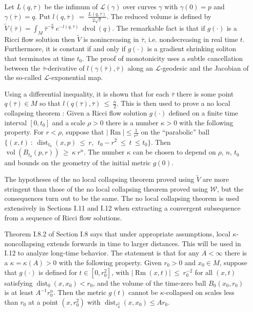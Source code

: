\documentclass[12pt]{amsart}
\newcommand{\dist}{\operatorname{dist}}
\newcommand{\dvol}{\operatorname{dvol}}
\newcommand{\Rm}{\operatorname{Rm}}
\newcommand{\vol}{\operatorname{vol}}
\numberwithin{equation}{section}
\theoremstyle{plain}
\theoremstyle{definition}
\theoremstyle{remark}
\begin{document}
Let $L(q, \overline{\tau})$
be the infimum of ${\mathcal L}(\gamma)$ over curves $\gamma$ with
$\gamma(0) = p$ and
$\gamma(\overline{\tau}) = q$. Put $l(q, \overline{\tau}) \: = \:
\frac{L(q, \overline{\tau})}{2\sqrt{\overline{\tau}}}$. The reduced volume
is defined by $\tilde{V}(\overline{\tau}) = 
\int_M \overline{\tau}^{- \frac{n}{2}} \: e^{-l(q, \overline{\tau})} \:
\dvol(q)$. The remarkable fact is that if $g(\cdot)$ is a Ricci flow
solution then $\tilde{V}$ is nonincreasing in $\overline{\tau}$, i.e.
nondecreasing in real time $t$. Furthermore, it is constant if and only if
$g(\cdot)$ is a gradient shrinking soliton that terminates at time
$t_0$. The proof of monotonicity uses a subtle cancellation between
the $\overline{\tau}$-derivative of $l(\gamma(\overline{\tau}), \overline{\tau})$
along an ${\mathcal L}$-geodesic and the Jacobian of the
so-called ${\mathcal L}$-exponential map.

Using a differential inequality, it is shown that for each $\overline{\tau}$ there
is some point $q(\overline{\tau}) \in M$ so that
$l(q(\overline{\tau}), \overline{\tau}) \: \le \: \frac{n}{2}$. This is then
used to prove a no local collapsing theorem :  Given a Ricci flow
solution $g(\cdot)$ 
defined on a finite time interval $[0, t_0]$
and a scale $\rho > 0$ there
is a number $\kappa > 0$
with the following property. For $r < \rho$, suppose that
$|\Rm| \le \frac{1}{r^2}$ on the
``parabolic'' ball $\{(x,t) \: : \: \dist_{t_0}(x, p) \: \le \: r, \: \:
t_0 - r^2 \: \le \: t \: \le t_0\}$. Then
$\vol(B_{t_0}(p, r)) \: \ge \: \kappa \: r^n$. The number $\kappa$ can be chosen
to depend on $\rho$, $n$, $t_0$ and bounds on the geometry of the initial metric
$g(0)$.

The hypotheses of the no local collapsing theorem proved using $\tilde{V}$ are
more stringent than those of the no local collapsing theorem proved using $\mathcal{W}$,
but the consequences turn out to be the same.  The no local collapsing theorem is
used extensively in Sections I.11 and I.12 when extracting a convergent
subsequence from a sequence of Ricci flow solutions.

Theorem I.8.2 of Section I.8 says that under appropriate
assumptions, local $\kappa$-noncollapsing extends forwards in
time to larger distances.  
This will be used in I.12 to analyze long-time behavior.
The statement is that for any $A < \infty$ there is a
$\kappa = \kappa(A) > 0$ with the following property. Given $r_0 > 0$ and 
$x_0 \in M$, suppose that
$g(\cdot)$ is defined for $t \in [0, r_0^2]$, with
$|\Rm(x,t)| \: \le \: r_0^{-2}$ for all $(x,t)$ satisfying
$\dist_0(x, x_0) < r_0$, and the volume of the time-zero ball
$B_0(x_0, r_0)$ is at least $A^{-1} r_0^n$. Then the metric
$g(t)$ cannot be $\kappa$-collapsed on scales less than $r_0$
at a point $(x, r_0^2)$ with  $\dist_{r_0^2}(x, x_0) \le Ar_0$.
\end{document}
